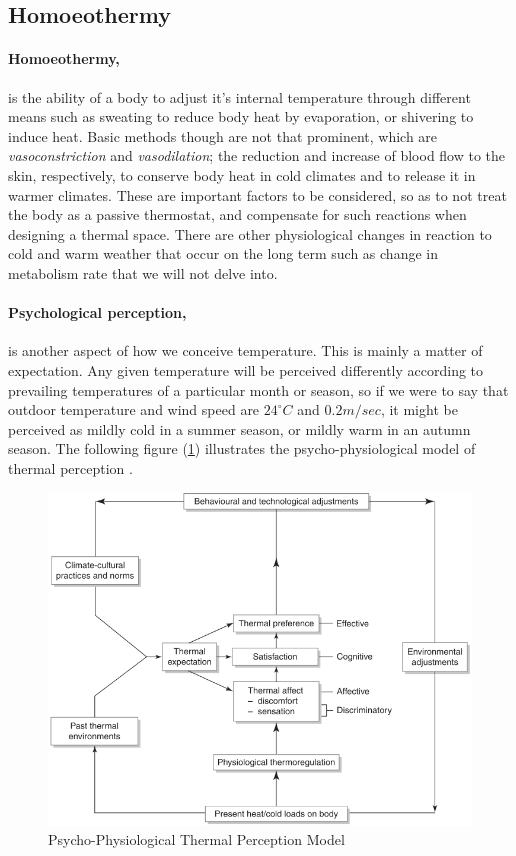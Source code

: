 \subsection{Homoeothermy}
\paragraph{Homoeothermy,}is the ability of a body to adjust it's internal temperature through
different means such as sweating to reduce body heat by evaporation, or shivering to induce heat.
Basic methods though are not that prominent, which are \emph{vasoconstriction} and
\emph{vasodilation}; the reduction and increase of blood flow to the skin, respectively, to conserve
body heat in cold climates and to release it in warmer climates. These are important factors to be
considered, so as to not treat the body as a passive thermostat, and compensate for such reactions
when designing a thermal space. There are other physiological changes in reaction to cold and warm
weather that occur on the long term such as change in metabolism rate that we will not delve into.

\paragraph{Psychological perception,}is another aspect of how we conceive temperature. This is
mainly a matter of expectation. Any given temperature will be perceived differently according to
prevailing temperatures of a particular month or season, so if we were to say that outdoor
temperature and wind speed are $24^\circ C$ and $0.2 m/sec$, it might be perceived as mildly cold in
a summer season, or mildly warm in an autumn season. The following figure
(\ref{PsychoPhysioModel}) illustrates the psycho-physiological model of thermal perception
\cite{szokolay08}.

\begin{figure}[htbp]
\includegraphics[width=13.5cm]{./Images/2-PsychoPhysioModel}
\caption[Psycho-Physiological Thermal Perception Model]{Psycho-Physiological Thermal Perception
Model \cite{szokolay08} \label{PsychoPhysioModel}}
\end{figure}

